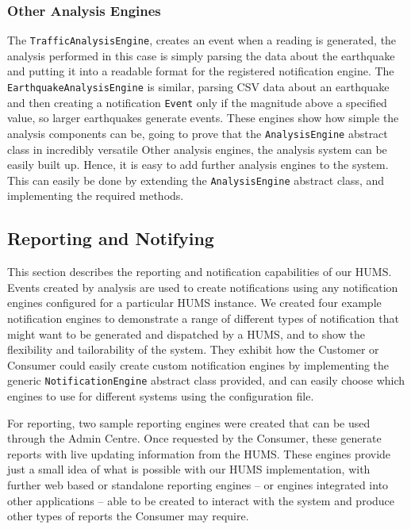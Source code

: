 \documentclass[10pt,a4paper]{article}
\begin{document}
\subsubsection{Other Analysis Engines}
The \texttt{TrafficAnalysisEngine}, creates an event when a reading is generated, the analysis performed in this case is simply parsing the data about the earthquake and putting it into a readable format for the registered notification engine. The \texttt{EarthquakeAnalysisEngine} is similar, parsing CSV data about an earthquake and then creating a notification \texttt{Event} only if the magnitude above a specified value, so larger earthquakes generate events. These engines show how simple the analysis components can be, going to prove that the \texttt{AnalysisEngine} abstract class in incredibly versatile  Other analysis engines, the analysis system can be easily built up. Hence, it is easy to add further analysis engines to the system. This can easily be done by extending the \texttt{AnalysisEngine} abstract class, and implementing the required methods.


\subsection{Reporting and Notifying}
\label{sec:reporting}

This section describes the reporting and notification capabilities of our HUMS. Events created by analysis are used to create notifications using any notification engines configured for a particular HUMS instance. We created four example notification engines to demonstrate a range of different types of notification that might want to be generated and dispatched by a HUMS, and to show the flexibility and tailorability of the system. They exhibit how the Customer or Consumer could easily create custom notification engines by implementing the generic \texttt{NotificationEngine} abstract class provided, and can easily choose which engines to use for different systems using the configuration file.

For reporting, two sample reporting engines were created that can be used through the Admin Centre. Once requested by the Consumer, these generate reports with live updating information from the HUMS. These engines provide just a small idea of what is possible with our HUMS implementation, with further web based or standalone reporting engines -- or engines integrated into other applications -- able to be created to interact with the system and produce other types of reports the Consumer may require.
\end{document}
